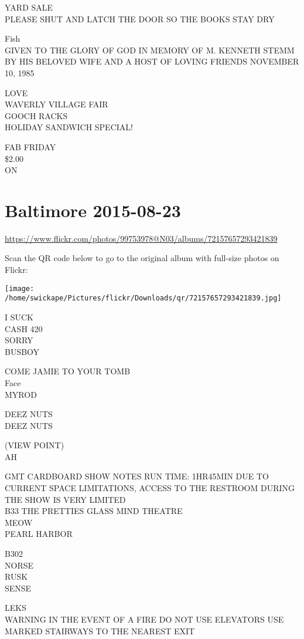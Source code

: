 \documentclass[10pt,letterpaper]{article}
\begin{document}
YARD SALE\\
PLEASE SHUT AND LATCH THE DOOR SO THE BOOKS STAY DRY

Fish\\
GIVEN TO THE GLORY OF GOD IN MEMORY OF M. KENNETH STEMM BY HIS BELOVED WIFE AND A HOST OF LOVING FRIENDS NOVEMBER 10, 1985

LOVE\\
WAVERLY VILLAGE FAIR\\
GOOCH RACKS\\
HOLIDAY SANDWICH SPECIAL!

FAB FRIDAY\\
\$2.00\\
ON
\pagebreak

\section*{Baltimore 2015-08-23}

\url{https://www.flickr.com/photos/99753978@N03/albums/72157657293421839}

Scan the QR code below to go to the original album with full-size photos on Flickr:

\texttt{[image: /home/swickape/Pictures/flickr/Downloads/qr/72157657293421839.jpg]}
\pagebreak

I SUCK\\
CASH 420\\
SORRY\\
BUSBOY

COME JAMIE TO YOUR TOMB\\
Face\\
MYROD

DEEZ NUTS\\
DEEZ NUTS

(VIEW POINT)\\
AH

GMT CARDBOARD SHOW NOTES RUN TIME: 1HR45MIN DUE TO CURRENT SPACE LIMITATIONS, ACCESS TO THE RESTROOM DURING THE SHOW IS VERY LIMITED\\
B33 THE PRETTIES GLASS MIND THEATRE\\
MEOW\\
PEARL HARBOR

B302\\
NORSE\\
RUSK\\
SENSE

LEKS\\
WARNING IN THE EVENT OF A FIRE DO NOT USE ELEVATORS USE MARKED STAIRWAYS TO THE NEAREST EXIT
\end{document}

